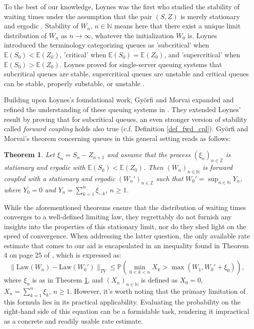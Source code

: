 \documentclass[a4paper,10pt]{article}
\newtheorem{theorem}{Theorem}[section]
\newcommand{\N}{\mathbb{N}}
\newcommand{\Z}{\mathbb{Z}}
\renewcommand{\P}{\mathbb{P}}
\newcommand{\E}{\mathbb{E}}
\newcommand{\law}[1]{\text{Law}(#1)}
\begin{document}
\smallskip
To the best of our knowledge, Loynes was the first who studied the stability of waiting times
under the assumption that the pair $(S,Z)$ is merely stationary and ergodic \cite{loynes1962}. Stability of $W_n$, $n\in\N$ means here that there exist a unique limit distribution of $W_n$ as $n\to\infty$, whatever the initialization $W_{0}$ is. Loynes introduced the terminology categorizing queues as 'subcritical' when $\E(S_0) < \E(Z_0)$, 'critical' when $\E(S_0) = \E(Z_0)$, and 'supercritical' when $\E(S_0) > \E(Z_0)$. Loynes proved for single-server queuing systems that subcritical queues are stable, supercritical queues are unstable and critical queues can be stable, properly substable, or unstable \cite{loynes1962}. 

\smallskip
Building upon Loynes's foundational work, Gy\"orfi and Morvai expanded and refined the understanding of these queuing systems in \cite{gyorfi2002}. They extended Loynes' result by proving that for subcritical queues, an even stronger version of stability called \emph{forward coupling} holds also true (c.f. Definition \ref{def_fwd_cpl}). Gy\"orfi and Morvai's theorem concerning queues in this general setting reads
as follows:
\begin{theorem}\label{thm:gyorfi}
	Let $\xi_n = S_n-Z_{n+1}$ and assume that the process 
	$(\xi_n)_{n\in\Z}$ is stationary and ergodic with $\E (S_0)<\E (Z_0)$.
	Then $(W_n)_{n\in\N}$ is forward coupled with a stationary and ergodic $(W_n')_{n\in\Z}$ such that  $W_0'=\sup_{n\in\N} Y_n$, where
	$Y_0 = 0$ and $Y_n = \sum_{k=1}^n \xi_{-k}$, $n\ge 1$.
\end{theorem}

While the aforementioned theorems ensure that the distribution of waiting times converges to a well-defined limiting law, they regrettably do not furnish any insights into the properties of this stationary limit, nor do they shed light on the speed of convergence. When addressing the latter question, the only available rate estimate that comes to our aid is encapsulated in an inequality found in Theorem 4 on page 25 of \cite{bborovkov72}, which is expressed as:
\begin{equation}\label{eq:borovkov}
\lVert \law{W_n}-\law{W_0'}\rVert_{TV}\le \P \left(\min_{0<k<n} X_k>\max (W_1,W_0'+\xi_0)\right),
\end{equation}
where $\xi_n$ is as in Theorem \ref{thm:gyorfi}, and $(X_n)_{n\in\N}$ is defined as $X_0 = 0$, $X_n = \sum_{k=1}^{n} \xi_k$, $n\ge 1$. However, it's worth noting that the primary limitation of this formula lies in its practical applicability. Evaluating the probability on the right-hand side of this equation can be a formidable task, rendering it impractical as a concrete and readily usable rate estimate. 
\end{document}
